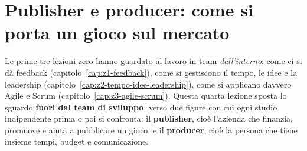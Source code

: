 %
%
%    
%    
%    
%    
%    
%

\chapter[Publisher e producer]{Publisher e producer: come si porta un gioco sul mercato}
\label{cap:z4-publisher-producer}

Le prime tre lezioni zero hanno guardato al lavoro in team \emph{dall'interno}:
come ci si dà feedback (capitolo~\ref{cap:z1-feedback}), come si gestiscono il
tempo, le idee e la leadership (capitolo~\ref{cap:z2-tempo-idee-leadership}),
come si applicano davvero Agile e Scrum (capitolo~\ref{cap:z3-agile-scrum}).
Questa quarta lezione sposta lo sguardo \textbf{fuori dal team di sviluppo},
verso due figure con cui ogni studio indipendente prima o poi si confronta:
il \textbf{publisher}, cioè l'azienda che finanzia, promuove e aiuta a
pubblicare un gioco, e il \textbf{producer}, cioè la persona che tiene insieme
tempi, budget e comunicazione.

